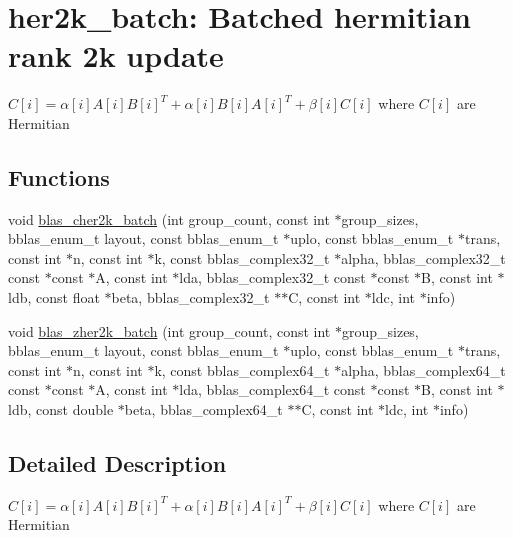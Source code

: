 \hypertarget{group__her2k__batch}{}\section{her2k\+\_\+batch\+: Batched hermitian rank 2k update}
\label{group__her2k__batch}


$ C[i] = \alpha[i] A[i] B[i]^T + \alpha[i] B[i] A[i]^T + \beta[i] C[i] $ where $ C[i] $ are Hermitian  


\subsection*{Functions}
\begin{DoxyCompactItemize}
\item 
void \mbox{\hyperlink{group__her2k__batch_gac4edc9f4c3f96b878e856a7aedba5d2d}{blas\+\_\+cher2k\+\_\+batch}} (int group\+\_\+count, const int $\ast$group\+\_\+sizes, bblas\+\_\+enum\+\_\+t layout, const bblas\+\_\+enum\+\_\+t $\ast$uplo, const bblas\+\_\+enum\+\_\+t $\ast$trans, const int $\ast$n, const int $\ast$k, const bblas\+\_\+complex32\+\_\+t $\ast$alpha, bblas\+\_\+complex32\+\_\+t const $\ast$const $\ast$A, const int $\ast$lda, bblas\+\_\+complex32\+\_\+t const $\ast$const $\ast$B, const int $\ast$ldb, const float $\ast$beta, bblas\+\_\+complex32\+\_\+t $\ast$$\ast$C, const int $\ast$ldc, int $\ast$info)
\item 
void \mbox{\hyperlink{group__her2k__batch_ga5a446eb5bdf3a533959c4f1fb2247973}{blas\+\_\+zher2k\+\_\+batch}} (int group\+\_\+count, const int $\ast$group\+\_\+sizes, bblas\+\_\+enum\+\_\+t layout, const bblas\+\_\+enum\+\_\+t $\ast$uplo, const bblas\+\_\+enum\+\_\+t $\ast$trans, const int $\ast$n, const int $\ast$k, const bblas\+\_\+complex64\+\_\+t $\ast$alpha, bblas\+\_\+complex64\+\_\+t const $\ast$const $\ast$A, const int $\ast$lda, bblas\+\_\+complex64\+\_\+t const $\ast$const $\ast$B, const int $\ast$ldb, const double $\ast$beta, bblas\+\_\+complex64\+\_\+t $\ast$$\ast$C, const int $\ast$ldc, int $\ast$info)
\end{DoxyCompactItemize}


\subsection{Detailed Description}
$ C[i] = \alpha[i] A[i] B[i]^T + \alpha[i] B[i] A[i]^T + \beta[i] C[i] $ where $ C[i] $ are Hermitian 



